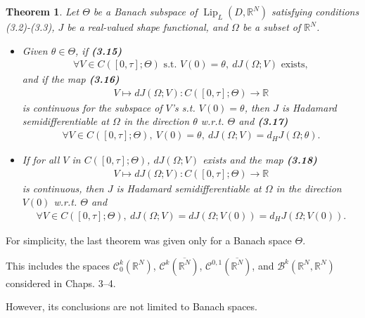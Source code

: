\documentclass[oneside]{book}
\numberwithin{equation}{section}
\newtheorem{theorem}{Theorem}[section]
\begin{document}
\begin{theorem}
    Let $\Theta$ be a Banach subspace of $\operatorname{Lip}_L(D,\mathbb{R}^N)$ satisfying conditions (3.2)-(3.3), $J$ be a real-valued shape functional, and $\Omega$ be a subset of $\mathbb{R}^N$.
    \begin{itemize}
        \item[(i)] Given $\theta\in\Theta$, if \textbf{(3.15)}
        \begin{align*}
            \forall V\in C\left([0,\tau];\Theta\right) \mbox{ s.t. } V(0) = \theta,\ dJ(\Omega;V) \mbox{ exists},
        \end{align*}
        and if the map \textbf{(3.16)}
        \begin{align*}
            V\mapsto dJ(\Omega;V): C\left([0,\tau];\Theta\right)\to\mathbb{R}
        \end{align*}
        is continuous for the subspace of $V$'s s.t. $V(0) = \theta$, then $J$ is Hadamard semidifferentiable at $\Omega$ in the direction $\theta$ w.r.t. $\Theta$ and \textbf{(3.17)}
        \begin{align*}
            \forall V\in C\left([0,\tau];\Theta\right),\ V(0) = \theta,\ dJ(\Omega;V) = d_HJ(\Omega;\theta).
        \end{align*}
        \item[(ii)] If for all $V$ in $C([0,\tau];\Theta)$, $dJ(\Omega;V)$ exists and the map \textbf{(3.18)}
        \begin{align*}
            V\mapsto dJ(\Omega;V):C\left([0,\tau];\Theta\right)\to\mathbb{R}
        \end{align*}
        is continuous, then $J$ is Hadamard semidifferentiable at $\Omega$ in the direction $V(0)$ w.r.t. $\Theta$ and
        \begin{align*}
            \forall V\in C\left([0,\tau];\Theta\right),\ dJ(\Omega;V) = dJ(\Omega;V(0)) = d_HJ(\Omega;V(0)).
        \end{align*}
    \end{itemize}
\end{theorem}

For simplicity, the last theorem was given only for a Banach space $\Theta$.

This includes the spaces $\mathcal{C}_0^k(\mathbb{R}^N)$, $\mathcal{C}^k(\overline{\mathbb{R}^N})$, $\mathcal{C}^{0,1}(\overline{\mathbb{R}^N})$, and $\mathcal{B}^k(\mathbb{R}^N,\mathbb{R}^N)$ considered in Chaps. 3--4.

However, its conclusions are not limited to Banach spaces.
\end{document}
